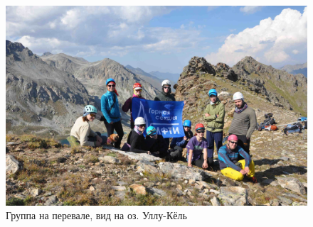 \begin{figure}[h!]
	\centering
	\includegraphics[width=0.7\linewidth]{../pics/DSC_0986}
	\caption{Группа на перевале, вид на оз. Уллу-Кёль}
	\label{fig:DSC_0986}
\end{figure}

\clearpage
